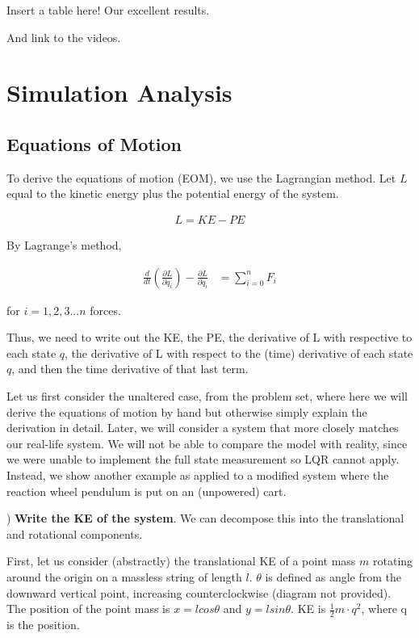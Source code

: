 \documentclass[conference]{IEEEtran}
\begin{document}
Insert a table here! Our excellent results.

And link to the videos.


\section{Simulation Analysis}

\subsection{Equations of Motion}

To derive the equations of motion (EOM), we use the Lagrangian method. Let $L$
equal to the kinetic energy plus the potential energy of the system.


\begin{align}
    L = KE - PE
\end{align}

By Lagrange's method,

\begin{align}
    \frac{d}{dt} (\frac{\partial{L}}{\partial \dot{q}_i}) -
    \frac{\partial{L}}{\partial q_i}  &= \sum_{i=0}^{n} F_i
\end{align}

for $i = 1,2,3 ... n $ forces.

Thus, we need to write out the KE, the PE, the derivative of L with respective
to each state $q$, the derivative of L with respect to the (time) derivative of
each state $q$, and then the time derivative of that last term.

Let us first consider the unaltered case, from the problem set, where here we
will derive the equations of motion by hand but otherwise simply explain the
derivation in detail. Later, we will consider a system that more closely matches
our real-life system. We will not be able to compare the model with reality,
since we were unable to implement the full state measurement so LQR cannot
apply. Instead, we show another example as applied to a modified system where
the reaction wheel pendulum is put on an (unpowered) cart.


) \textbf{Write the KE of the system}. We can decompose this into the translational and
rotational components.

First, let us consider (abstractly) the translational KE of a point mass $m$ rotating
around the origin on a massless string of length $l$. $\theta$ is defined as
angle from the downward vertical point, increasing counterclockwise  (diagram not provided).
The position of the point mass is $x = l cos \theta$ and $y = l sin \theta$.
KE is $\frac{1}{2} m \cdot q^2$, where q is the position.
\end{document}
